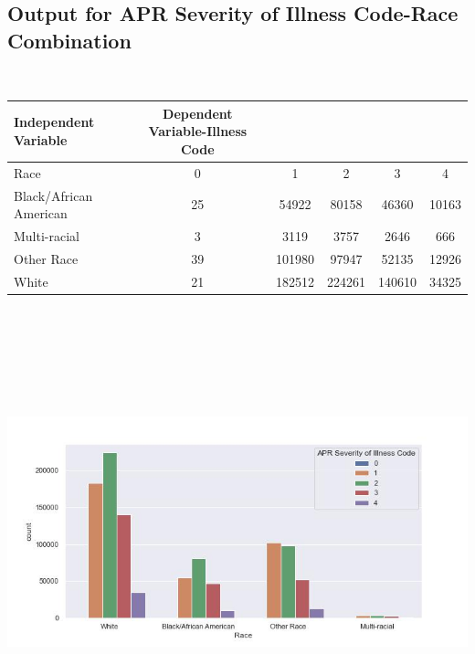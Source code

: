 \documentclass[
	letterpaper, %
]{jdf}
\begin{document}
\subsection{Output for APR Severity of Illness Code-Race Combination}
\ 
\begin{jdftable}
\label{table:Example}
\small %
\begin{tabular}{@{} l c c c c c}
\textbf{Independent Variable} & \textbf{Dependent Variable-Illness Code} & & & & \\
	\toprule[0.5pt]
Race & 0 & 1 & 2 & 3 & 4 \\
\midrule
Black/African American & 25 & 54922 & 80158 & 46360 & 10163 \\
\midrule
Multi-racial & 3 & 3119 & 3757 & 2646 & 666 \\
\midrule
Other Race & 39 & 101980 & 97947 & 52135 & 12926 \\
\midrule
White & 21 & 182512 & 224261 & 140610 & 34325 \\
\end{tabular}
\end{jdftable}

\begin{jdffigure}
\includegraphics[height=13cm]{Figures/code-race.jpg} \\
\label{fig:code-race}%
\end{jdffigure}
\end{document}
